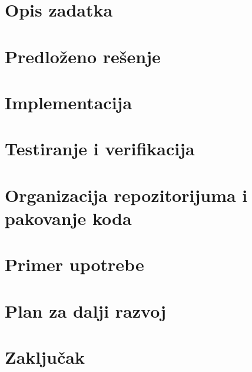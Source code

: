 \documentclass[a4paper]{article}
\begin{document}
\section{Opis zadatka}

\section{Predloženo rešenje}

\section{Implementacija}

\section{Testiranje i verifikacija}

\section{Organizacija repozitorijuma i pakovanje koda}

\section{Primer upotrebe}

\section{Plan za dalji razvoj}

\section{Zaključak}
\end{document}
